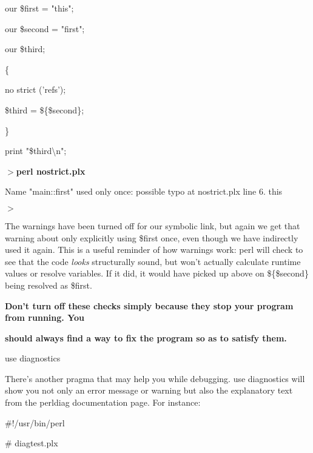 \documentclass[a4paper,11pt]{book}
\begin{document}
\noindent 

\noindent our \$first = "this";

\noindent our \$second = "first";

\noindent our \$third;

\noindent 

\noindent \{

\noindent no strict ('refs');

\noindent \$third = \$\{\$second\};

\noindent \}

\noindent 

\noindent print "\$third\textbackslash n";

\noindent 

\noindent $>$\textbf{perl nostrict.plx}

\noindent Name "main::first" used only once: possible typo at nostrict.plx line 6. this

\noindent $>$

\noindent 

\noindent The warnings have been turned off for our symbolic link, but again we get that warning about only explicitly using \$first once, even though we have indirectly used it again. This is a useful reminder of how warnings work: perl will check to see that the code \textit{looks }structurally sound, but won't actually calculate runtime values or resolve variables. If it did, it would have picked up above on \$\{\$second\} being resolved as \$first.

\noindent 

\noindent 

\noindent \textbf{Don't turn off these checks simply because they stop your program from running. You}

\noindent \textbf{should always find a way to fix the program so as to satisfy them.}

\noindent 

\noindent 

\noindent use diagnostics

\noindent 

\noindent There's another pragma that may help you while debugging. use diagnostics will show you not only an error message or warning but also the explanatory text from the perldiag documentation page. For instance:

\noindent 

\noindent \#!/usr/bin/perl

\noindent \# diagtest.plx
\end{document}
